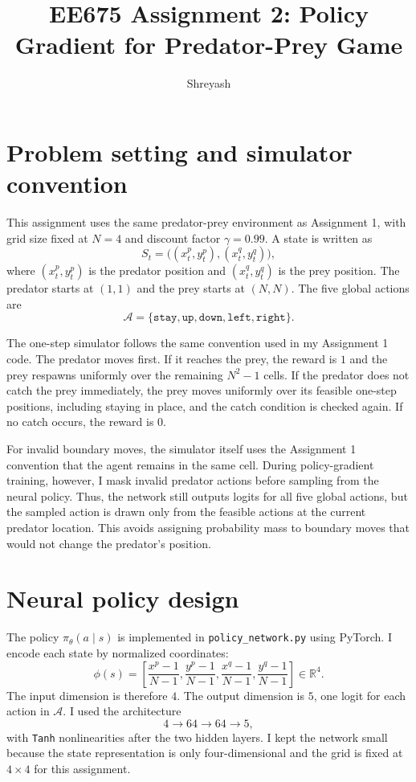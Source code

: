 \documentclass[11pt,a4paper]{article}
\title{EE675 Assignment 2: Policy Gradient for Predator-Prey Game}
\author{Shreyash}
\date{}
\begin{document}
\maketitle

\section{Problem setting and simulator convention}
This assignment uses the same predator-prey environment as Assignment 1, with grid size fixed at $N=4$ and discount factor $\gamma=0.99$. A state is written as
\[
    S_t = \big((x_t^p,y_t^p),(x_t^q,y_t^q)\big),
\]
where $(x_t^p,y_t^p)$ is the predator position and $(x_t^q,y_t^q)$ is the prey position. The predator starts at $(1,1)$ and the prey starts at $(N,N)$. The five global actions are
\[
    \mathcal{A}=\{\texttt{stay},\texttt{up},\texttt{down},\texttt{left},\texttt{right}\}.
\]

The one-step simulator follows the same convention used in my Assignment 1 code. The predator moves first. If it reaches the prey, the reward is $1$ and the prey respawns uniformly over the remaining $N^2-1$ cells. If the predator does not catch the prey immediately, the prey moves uniformly over its feasible one-step positions, including staying in place, and the catch condition is checked again. If no catch occurs, the reward is $0$.

For invalid boundary moves, the simulator itself uses the Assignment 1 convention that the agent remains in the same cell. During policy-gradient training, however, I mask invalid predator actions before sampling from the neural policy. Thus, the network still outputs logits for all five global actions, but the sampled action is drawn only from the feasible actions at the current predator location. This avoids assigning probability mass to boundary moves that would not change the predator's position.

\section{Neural policy design}
The policy $\pi_\theta(a\mid s)$ is implemented in \texttt{policy\_network.py} using PyTorch. I encode each state by normalized coordinates:
\[
    \phi(s)=\left[\frac{x^p-1}{N-1},\frac{y^p-1}{N-1},\frac{x^q-1}{N-1},\frac{y^q-1}{N-1}\right] \in \mathbb{R}^4.
\]
The input dimension is therefore $4$. The output dimension is $5$, one logit for each action in $\mathcal{A}$. I used the architecture
\[
    4 \rightarrow 64 \rightarrow 64 \rightarrow 5,
\]
with \texttt{Tanh} nonlinearities after the two hidden layers. I kept the network small because the state representation is only four-dimensional and the grid is fixed at $4\times4$ for this assignment.
\end{document}
